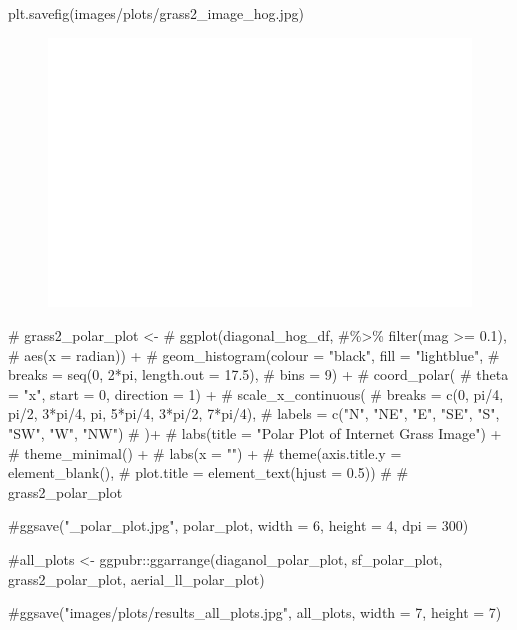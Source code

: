 \documentclass[
  letterpaper,
]{report}
\newenvironment{Shaded}{\begin{snugshade}}{\end{snugshade}}
\newcommand{\CommentTok}[1]{\textcolor[rgb]{0.37,0.37,0.37}{#1}}
\newcommand{\NormalTok}[1]{\textcolor[rgb]{0.00,0.23,0.31}{#1}}
\newcommand{\StringTok}[1]{\textcolor[rgb]{0.13,0.47,0.30}{#1}}
\begin{document}
\begin{Shaded}
\begin{Highlighting}[]
\NormalTok{plt.savefig(}\StringTok{\textquotesingle{}images/plots/grass2\_image\_hog.jpg\textquotesingle{}}\NormalTok{)}
\end{Highlighting}
\end{Shaded}

\begin{figure}[H]

{\centering \includegraphics{results_files/figure-pdf/unnamed-chunk-30-2.pdf}

}

\end{figure}

\begin{Shaded}
\begin{Highlighting}[]
\CommentTok{\# grass2\_polar\_plot \textless{}{-}}
\CommentTok{\# ggplot(diagonal\_hog\_df, \#\%\textgreater{}\% filter(mag \textgreater{}= 0.1), }
\CommentTok{\#        aes(x = radian)) +}
\CommentTok{\#   geom\_histogram(colour = "black", fill = "lightblue", }
\CommentTok{\#                  breaks = seq(0, 2*pi, length.out = 17.5),}
\CommentTok{\#                  bins = 9) +}
\CommentTok{\#   coord\_polar(}
\CommentTok{\#     theta = "x", start = 0, direction = 1) +}
\CommentTok{\#   scale\_x\_continuous(}
\CommentTok{\#     breaks = c(0, pi/4, pi/2, 3*pi/4, pi, 5*pi/4, 3*pi/2, 7*pi/4), }
\CommentTok{\#     labels = c("N", "NE", "E", "SE", "S", "SW", "W", "NW")}
\CommentTok{\#   )+}
\CommentTok{\#   labs(title = "Polar Plot of Internet Grass Image") +}
\CommentTok{\#     theme\_minimal() +}
\CommentTok{\#   labs(x = "") +}
\CommentTok{\#   theme(axis.title.y = element\_blank(),}
\CommentTok{\#         plot.title = element\_text(hjust = 0.5))}
\CommentTok{\# }
\CommentTok{\# grass2\_polar\_plot}

\CommentTok{\#ggsave("\_polar\_plot.jpg", polar\_plot, width = 6, height = 4, dpi = 300)}

\CommentTok{\#all\_plots \textless{}{-} ggpubr::ggarrange(diaganol\_polar\_plot, sf\_polar\_plot, grass2\_polar\_plot, aerial\_ll\_polar\_plot)}

\CommentTok{\#ggsave("images/plots/results\_all\_plots.jpg", all\_plots, width = 7, height = 7)}
\end{Highlighting}
\end{Shaded}
\end{document}
